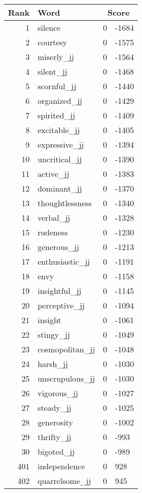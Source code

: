 \begin{longtable}[!htbp]{| rlr@{.}l |}
    \hline
    \textbf{Rank} & \textbf{Word} & \multicolumn{2}{c|}{\textbf{Score}} \\
    \hline
    \endhead
    1 & silence & 0 & -1684 \\
    2 & courtesy & 0 & -1575 \\
    3 & miserly\_jj & 0 & -1564 \\
    4 & silent\_jj & 0 & -1468 \\
    5 & scornful\_jj & 0 & -1440 \\
    6 & organized\_jj & 0 & -1429 \\
    7 & spirited\_jj & 0 & -1409 \\
    8 & excitable\_jj & 0 & -1405 \\
    9 & expressive\_jj & 0 & -1394 \\
    10 & uncritical\_jj & 0 & -1390 \\
    11 & active\_jj & 0 & -1383 \\
    12 & dominant\_jj & 0 & -1370 \\
    13 & thoughtlessness & 0 & -1340 \\
    14 & verbal\_jj & 0 & -1328 \\
    15 & rudeness & 0 & -1230 \\
    16 & generous\_jj & 0 & -1213 \\
    17 & enthusiastic\_jj & 0 & -1191 \\
    18 & envy & 0 & -1158 \\
    19 & insightful\_jj & 0 & -1145 \\
    20 & perceptive\_jj & 0 & -1094 \\
    21 & insight & 0 & -1061 \\
    22 & stingy\_jj & 0 & -1049 \\
    23 & cosmopolitan\_jj & 0 & -1048 \\
    24 & harsh\_jj & 0 & -1030 \\
    25 & unscrupulous\_jj & 0 & -1030 \\
    26 & vigorous\_jj & 0 & -1027 \\
    27 & steady\_jj & 0 & -1025 \\
    28 & generosity & 0 & -1002 \\
    29 & thrifty\_jj & 0 & -993 \\
    30 & bigoted\_jj & 0 & -989 \\
    401 & independence & 0 & 928 \\
    402 & quarrelsome\_jj & 0 & 945 \\

\end{longtable}
